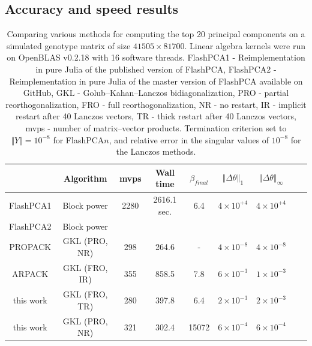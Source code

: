 \documentclass[review]{siamart0516}
\begin{document}
\subsection{Accuracy and speed results}

\begin{table}
\begin{tabular}{|c|c|c|c|c|c|c|c|c|}
\hline
 & Algorithm & mvps & Wall time & $\beta_{final}$ & $\left\Vert \Delta\theta\right\Vert _{1}$ & $\left\Vert \Delta\theta\right\Vert _{\infty}$\tabularnewline
\hline
\hline
FlashPCA1 & Block power & 2280 & 2616.1 sec. & 6.4 & $4\times10^{+4}$ & $4\times10^{+4}$\tabularnewline
\hline
FlashPCA2 & Block power &  &  &  &  & \tabularnewline
\hline
PROPACK & GKL (PRO, NR) & 298 & 264.6 & - & $4\times10^{-8}$ & $4\times10^{-8}$\tabularnewline
\hline
ARPACK & GKL (FRO, IR) & 355 & 858.5 & 7.8 & $6\times10^{-3}$ & $1\times10^{-3}$\tabularnewline
\hline
this work & GKL (FRO, TR) & 280 & 397.8 & 6.4 & $2\times10^{-3}$ & $2\times10^{-3}$\tabularnewline
\hline
this work & GKL (PRO, NR) & 321 & 302.4 & 15072 & $6\times10^{-4}$ & $6\times10^{-4}$\tabularnewline
\hline
\end{tabular}

\caption{Comparing various methods for computing the top 20 principal
components on a simulated genotype matrix of size $41505\times81700$.
Linear algebra kernels were run on OpenBLAS v0.2.18 with 16 software threads.
FlashPCA1 - Reimplementation in pure Julia of the published version of FlashPCA,
FlashPCA2 - Reimplementation in pure Julia of the master version of FlashPCA available on GitHub,
GKL - Golub--Kahan--Lanczos bidiagonalization,
PRO - partial reorthogonalization,
FRO - full reorthogonalization,
NR - no restart,
IR - implicit restart after 40 Lanczos vectors,
TR - thick restart after 40 Lanczos vectors,
mvps - number of matrix--vector products.
Termination criterion set to $\Vert Y\Vert = 10^{-8}$ for FlashPCA$n$,
and relative error in the singular values of $10^{-8}$ for the Lanczos methods.
}
\end{table}
\end{document}
